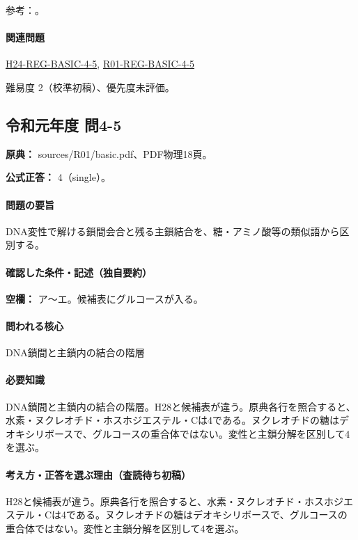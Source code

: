 \par 参考：\cite{bu_dna_melting,nhgri_dna}。

\paragraph{関連問題} \hyperref[q:h24-reg-basic-4-5]{H24-REG-BASIC-4-5}, \hyperref[q:r01-reg-basic-4-5]{R01-REG-BASIC-4-5}

\par 難易度 2（校準初稿）、優先度未評価。

\subsection{令和元年度 問4-5}
\label{q:r01-reg-basic-4-5}

\noindent\textbf{原典：} sources/R01/basic.pdf、PDF物理18頁。

\textbf{公式正答：} 4（single）。

\paragraph{問題の要旨} DNA変性で解ける鎖間会合と残る主鎖結合を、糖・アミノ酸等の類似語から区別する。

\paragraph{確認した条件・記述（独自要約）}\mbox{}\par

\noindent\textbf{空欄：} ア〜エ。候補表にグルコースが入る。\par

\paragraph{問われる核心} DNA鎖間と主鎖内の結合の階層

\paragraph{必要知識} DNA鎖間と主鎖内の結合の階層。H28と候補表が違う。原典各行を照合すると、水素・ヌクレオチド・ホスホジエステル・Cは4である。ヌクレオチドの糖はデオキシリボースで、グルコースの重合体ではない。変性と主鎖分解を区別して4を選ぶ。

\paragraph{考え方・正答を選ぶ理由（査読待ち初稿）} H28と候補表が違う。原典各行を照合すると、水素・ヌクレオチド・ホスホジエステル・Cは4である。ヌクレオチドの糖はデオキシリボースで、グルコースの重合体ではない。変性と主鎖分解を区別して4を選ぶ。

